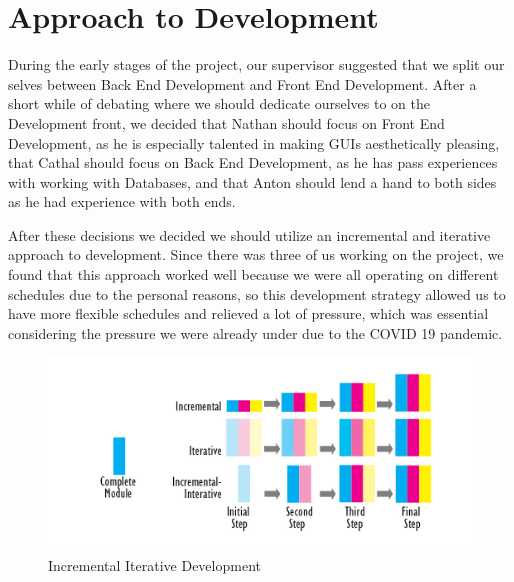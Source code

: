 \section{Approach to Development}
During the early stages of the project, our supervisor suggested that we split our selves between Back End Development and Front End Development. After a short while of debating where we should dedicate ourselves to on the Development front, we decided that Nathan should focus on Front End Development, as he is especially talented in making GUIs aesthetically pleasing, that Cathal should focus on Back End Development, as he has pass experiences with working with Databases, and that Anton should lend a hand to both sides as he had experience with both ends.\par
After these decisions we decided we should utilize an incremental and iterative approach to development. Since there was three of us working on the project, we found that this approach worked well because we were all operating on different schedules due to the personal reasons, so this development strategy allowed us to have more flexible schedules and relieved a lot of pressure, which was essential considering the pressure we were already under due to the COVID 19 pandemic. \par

\begin{figure}[th]
\renewcommand\thefigure{2.1}
\centering
\includegraphics[scale=1.3]{img/Incremental-Interative-Design-Approach.jpg}
\caption{Incremental Iterative Development}
\label{Agile}
\end{figure}

